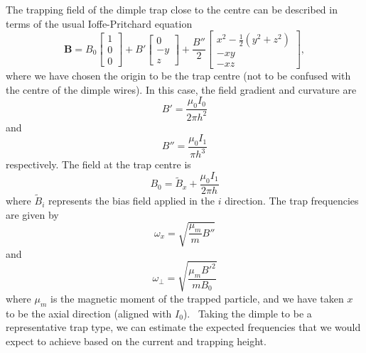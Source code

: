 The trapping field of the dimple trap close to the centre can be described in
terms of the usual Ioffe-Pritchard equation~\cite{Foot2005}
%
\begin{equation}
  \mathbf{B} = B_0 \begin{bmatrix} 1 \\ 0 \\0 \end{bmatrix}
               + B' \begin{bmatrix} 0 \\ -y \\ z \end{bmatrix}
               + \frac{B''}{2} \begin{bmatrix} 
                  x^2 - \frac{1}{2}(y^2 + z^2) \\
                  -xy \\
                  -xz
               \end{bmatrix},
\end{equation}
%
where we have chosen the origin to be the trap centre (not to be confused with
the centre of the dimple wires). In this case, the field gradient and curvature
are
%
\begin{equation}
  B' = \frac{\mu_0 I_0}{2\pi h^2}
\end{equation}
%
and
%
\begin{equation}
  B'' = \frac{\mu_0 I_1}{\pi h^3}
\end{equation}
%
respectively. The field at the trap centre is
%
\begin{equation}
  B_0 = \widetilde{B}_x + \frac{\mu_0 I_1}{2\pi h}
\end{equation}
%
where $\widetilde{B}_i$ represents the bias field applied in the $i$ direction.
The trap frequencies are given by
\begin{equation}
  \omega_x = \sqrt{\frac{\mu_m}{m}B''}
\end{equation}
and
\begin{equation}
  \omega_\perp = \sqrt{\frac{\mu_m {B'}^2}{m B_0}}
\end{equation}
where $\mu_m$ is the magnetic moment of the trapped particle, and we have taken
$x$ to be the axial direction (aligned with $I_0$).~\cite{2011Ac}
Taking the dimple to be a representative trap type, we can estimate the expected
frequencies that we would expect to achieve based on the current and trapping
height.


